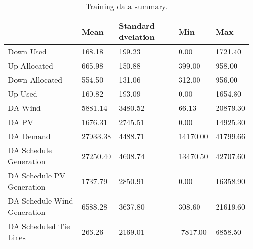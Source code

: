 \begin{table}[H] 
    \caption{Training data summary. \label{training_data_sum}}
    \begin{tabularx}{\textwidth}{CCCCC}
    \toprule
    & \textbf{Mean}	& \textbf{Standard dveiation}	& \textbf{Min} & \textbf{Max}\\
    \midrule
    Down Used & 168.18 & 199.23 & 0.00 & 1721.40 \\
    Up Allocated & 665.98 & 150.88 & 399.00 & 958.00 \\
    Down Allocated & 554.50 & 131.06 & 312.00 & 956.00 \\
    Up Used & 160.82 & 193.09 & 0.00 & 1654.80 \\
    DA Wind & 5881.14 & 3480.52 & 66.13 & 20879.30 \\
    DA PV & 1676.31 & 2745.51 & 0.00 & 14925.30 \\
    DA Demand & 27933.38 & 4488.71 & 14170.00 & 41799.66 \\
    DA Schedule Generation & 27250.40 & 4608.74 & 13470.50 & 42707.60 \\
    DA Schedule PV Generation & 1737.79 & 2850.91 & 0.00 & 16358.90 \\
    DA Schedule Wind Generation & 6588.28 & 3637.80 & 308.60 & 21619.60 \\
    DA Scheduled Tie Lines & 266.26 & 2169.01 & -7817.00 & 6858.50 \\
    \bottomrule
    \end{tabularx}
\end{table}

